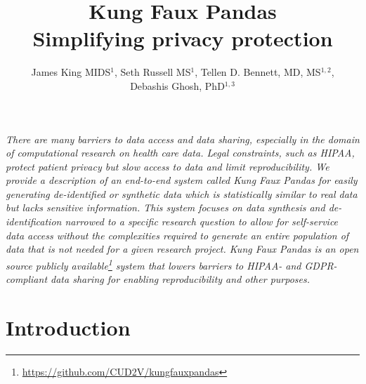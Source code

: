 \documentclass{amia}
\begin{document}
\title{%
  Kung Faux Pandas \\
  \large Simplifying privacy protection
  }

\author{
  James King MIDS$^{1}$, Seth Russell MS$^{1}$, Tellen D. Bennett, MD, MS$^{1,2}$,\\ Debashis Ghosh, PhD$^{1,3}$
  }
  

\maketitle






\textit{There are many barriers to data access and data sharing, especially in the domain of computational research on health care data. Legal constraints, such as HIPAA, protect patient privacy but slow access to data and limit reproducibility. We provide a description of an end-to-end system called \emph{Kung Faux Pandas} for easily generating de-identified or synthetic data which is statistically similar to real data but lacks sensitive information. This system focuses on data synthesis and de-identification narrowed to a specific research question to allow for self-service data access without the complexities required to generate an entire population of data that is not needed for a given research project. Kung Faux Pandas is an open source publicly available\footnote{\url{https://github.com/CUD2V/kungfauxpandas}} system that lowers barriers to HIPAA- and GDPR-compliant data sharing for enabling reproducibility and other purposes.}

\section{Introduction}
\end{document}
